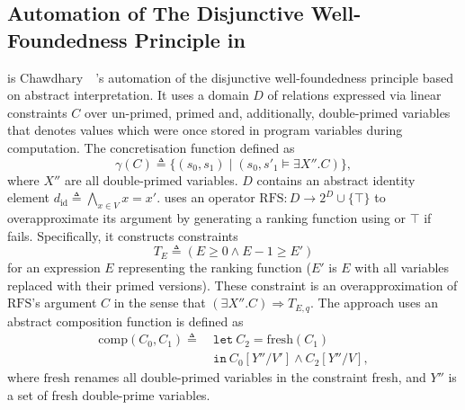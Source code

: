 \subsection{Automation of The Disjunctive Well-Foundedness Principle in \dta}
\label{sec:dta}

\dta is Chawdhary~\etal~\cite{chawdhary2008ra}'s automation of the disjunctive well-foundedness principle based on abstract interpretation. It uses a domain $D$ of relations expressed via linear constraints $C$ over un-primed, primed and, additionally, double-primed variables that denotes values which were once stored in program variables during computation. The concretisation function defined as $$\gamma(C) \triangleq \{(s_0, s_1)\mid (s_0, s'_1 \models \exists X''.C)\},$$ where $X''$ are all double-primed variables. $D$ contains an abstract identity element $d_\mathrm{id} \triangleq \bigwedge_{x\in V} x = x'$. \dta uses an operator $\mathrm{RFS}: D \rightarrow 2^D \cup \{ \top \}$ to overapproximate its argument by generating a ranking function using \rfs or $\top$ if \rfs fails. Specifically, it constructs constraints $$T_{E} \triangleq (E \ge 0 \wedge E - 1 \ge E')$$ for an expression $E$ representing the ranking function ($E'$ is $E$ with all variables replaced with their primed versions). These constraint is an overapproximation of $\mathrm{RFS}$'s argument $C$ in the sense that $(\exists X''. C) \Rightarrow T_{E,q}$. The approach uses an abstract composition function is defined as
\begin{align*}
  \mathrm{comp}(C_0, C_1) \triangleq\ &\mathtt{let}\ C_2 = \mathrm{fresh}(C_1)\\
  &\mathtt{in}\ C_0[Y''/V'] \wedge C_2[Y''/V],
\end{align*}
\noindent where $\mathrm{fresh}$ renames all double-primed variables in the constraint fresh, and $Y''$ is a set of fresh double-prime variables.

